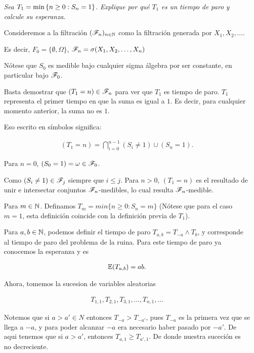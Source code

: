 \emph
{
	Sea $T_1=\min\left\{ n\geq 0:S_n=1\right\} $. Explique por qu\'e $T_1$ es un 
	tiempo de paro y calcule su esperanza.
}

\afterstatement\pn

	Consideremos a la filtración $(\mathscr{F}_n)_{n\in\mathbb{N}}$ como la filtración 
	generada por $X_1, X_2, \dots$.\pn

	Es decir, $F_0 = \{\emptyset, \Omega\}$, $\mathscr{F}_n = \sigma(X_1, X_2, \dots, X_n)$\pn

	Nótese que $S_0$ es medible bajo cualquier sigma álgebra por ser constante, en particular bajo
	$\mathscr{F}_0$.\pn

	Basta demostrar que $(T_1 = n) \in \mathscr{F}_n$ para ver que $T_1$ es tiempo de paro. $T_1$ 
	representa el primer tiempo en que la suma es igual a $1$. Es decir, para cualquier 
	momento anterior, la suma no es $1$.\pn

	Eso escrito en símbolos significa:

    \begin{align}
        (T_1 = n) = \bigcap_{i=0}^{n-1}(S_i \not= 1) \cup (S_n = 1).
    \end{align}\pn

	Para $n=0$, $(S_0 = 1) = \omega \in \mathscr{F}_0$.\pn

	Como $(S_i \not= 1) \in \mathscr{F}_j$ siempre que $i \leq j$. Para $n>0$, $(T_1 = n)$ es el resultado de 
	unir e intersectar conjuntos $\mathscr{F}_n$-medibles, lo cual resulta $\mathscr{F}_n$-medible.\pn

	Para $m \in \mathbb{N}$. Definamos $T_m = min\{n \geq 0 : S_n = m\}$ 
	(Nótese que para el caso $m=1$, esta definición	coincide con la definición previa de $T_1$).\pn
	
	Para $a,b \in \mathbb{N}$, podemos definir el tiempo de paro $T_{a,b} = T_{-a} \wedge T_b$, y 
	corresponde al 	tiempo de paro del problema de la ruina. Para este tiempo de paro ya conocemos 
	la esperanza y es
	
    \begin{align}
        \mathbb{E}(T_{a,b}) = ab.
    \end{align}\pn
	
	Ahora, tomemos la sucesion de variables aleatorias
    
    \begin{align}
        T_{1,1}, T_{2,1}, T_{3,1}, \dots, T_{n,1},\dots
    \end{align}\pn 
    
    Notemos que si $a>a' \in N$ entonces $T_{-a} > T_{-a'}$, pues $T_{-a}$ es la primera vez
	que se llega a $-a$, y para poder alcanzar $-a$ era necesario haber pasado por $-a'$.
	De aqui tenemos que si $a>a'$, entonces $T_{a,1} \geq T_{a',1}$. De donde nuestra suceción es 
	no decreciente.\pn
	
